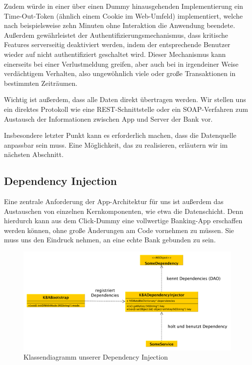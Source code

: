 	Zudem würde in einer über einen Dummy hinausgehenden Implementierung ein Time-Out-Token (ähnlich einem Cookie im Web-Umfeld) implementiert, welche nach beispielsweise zehn Minuten ohne Interaktion die Anwendung beendete. Außerdem gewährleistet der Authentifizierungsmechanismus, dass kritische Features serverseitig deaktiviert werden, indem der entsprechende Benutzer wieder auf nicht authentifiziert geschaltet wird. Dieser Mechanismus kann einerseits bei einer Verlustmeldung greifen, aber auch bei in irgendeiner Weise verdächtigem Verhalten, also ungewöhnlich viele oder große Transaktionen in bestimmten Zeiträumen.
	
	Wichtig ist außerdem, dass alle Daten direkt übertragen werden. Wir stellen uns ein direktes Protokoll wie eine \acs{REST}-Schnittstelle oder ein \acs{SOAP}-Verfahren zum Austausch der Informationen zwischen App und Server der Bank vor.
	
	Insbesondere letzter Punkt kann es erforderlich machen, dass die Datenquelle anpassbar sein muss. Eine Möglichkeit, das zu realisieren, erläutern wir im nächsten Abschnitt.

\subsection{Dependency Injection}
%
%
	Eine zentrale Anforderung der App-Architektur für uns ist außerdem das Austauschen von einzelnen Kernkomponenten, wie etwa die Datenschicht. Denn hierdurch kann aus dem Click-Dummy eine vollwertige Banking-App erschaffen werden können, ohne große Änderungen am Code vornehmen zu müssen. Sie muss uns den Eindruck nehmen, an eine echte Bank gebunden zu sein.
	
\begin{figure}[h]
	\centering
	\includegraphics[scale=.25]{Pictures/uml-di}
	\caption{Klassendiagramm unserer Dependency Injection\label{fig:UmlDi}}
\end{figure}
	
